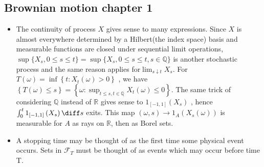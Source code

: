 \subsection{Brownian motion chapter 1}
\begin{itemize}
\item The continuity of process $ X $ gives sense to many expressions. Since $ X $ is almost everywhere determined by a Hilbert(the index space) basis and measurable functions are closed under sequential limit operations,
$  \sup \{ X _ { s } , 0 \leq s \leq t \} = \sup \{ X_ { s } , 0 \leq s \leq t , s \in \mathbb{Q} \} $ is another stochastic process and the same reason applies for$ \lim _{s \downarrow t} X_{s}$.  For $T(\omega)=\inf \left\{t: X_{t}(\omega)>0\right\}$
, we have $ \left\lbrace T(\omega) \leq s\right\rbrace = \left\{\omega: \sup_{t\leq s, t \in \mathbb{Q}}X_{t}(\omega)\leq0\right\}  $.
The same trick of considering $ \mathbb{Q} $ instead of $ \mathbb{R} $ gives sense to $ 1_{[-1,1]}\left(X_{s}\right) $ , hence
 $ \int_{0}^{t} 1_{[-1,1]}\left(X_{s}\right) \diff s$ exits. This map $(\omega, s) \rightarrow 1_{A}\left(X_{s}(\omega)\right)$ is measurable for $ A $ as rays on $ \mathbb{R} $, then as Borel sets.
 \item A stopping time may be thought of as the first time some physical event occurs. Sets in $ \mathscr{F}_{T} $ must be thought of as events which may occur
 before time T.
 

\end{itemize}
